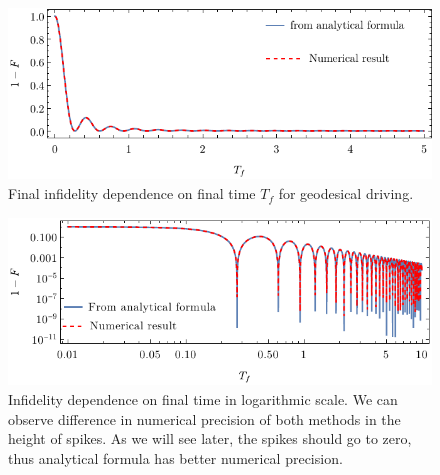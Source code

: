 \vspace{-10pt}\begin{figure}[H]
    \centering
    \includegraphics[scale=1.2]{../img/infidelityTfPlot.pdf}
    \caption{Final infidelity dependence on final time $T_f$ for geodesical driving.}
    \label{fig:infidelityTfPlot}
\end{figure}

\begin{figure}[H]
    \centering
    \includegraphics[scale=1.2]{../img/infidelityTfPlotLog.pdf}
    \caption{Infidelity dependence on final time in logarithmic scale. We can observe difference in numerical precision of both methods in the height of spikes. As we will see later, the spikes should go to zero, thus analytical formula has better numerical precision.}
    \label{fig:infidelityTfPlotLog}
\end{figure}



